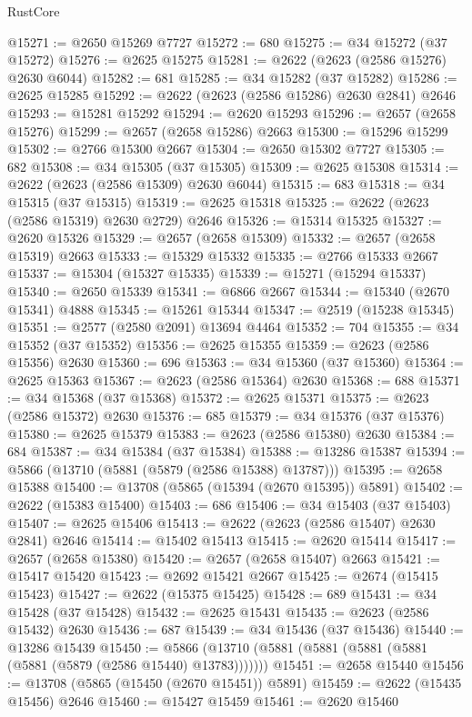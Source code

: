 \begin{lexlean}{RustCore}
\begin{coremodule}
@15271 := @2650 @15269 @7727
@15272 := 680
@15275 := @34 @15272 (@37 @15272)
@15276 := @2625 @15275
@15281 := @2622 (@2623 (@2586 @15276) @2630 @6044)
@15282 := 681
@15285 := @34 @15282 (@37 @15282)
@15286 := @2625 @15285
@15292 := @2622 (@2623 (@2586 @15286) @2630 @2841) @2646
@15293 := @15281 @15292
@15294 := @2620 @15293
@15296 := @2657 (@2658 @15276)
@15299 := @2657 (@2658 @15286) @2663
@15300 := @15296 @15299
@15302 := @2766 @15300 @2667
@15304 := @2650 @15302 @7727
@15305 := 682
@15308 := @34 @15305 (@37 @15305)
@15309 := @2625 @15308
@15314 := @2622 (@2623 (@2586 @15309) @2630 @6044)
@15315 := 683
@15318 := @34 @15315 (@37 @15315)
@15319 := @2625 @15318
@15325 := @2622 (@2623 (@2586 @15319) @2630 @2729) @2646
@15326 := @15314 @15325
@15327 := @2620 @15326
@15329 := @2657 (@2658 @15309)
@15332 := @2657 (@2658 @15319) @2663
@15333 := @15329 @15332
@15335 := @2766 @15333 @2667
@15337 := @15304 (@15327 @15335)
@15339 := @15271 (@15294 @15337)
@15340 := @2650 @15339
@15341 := @6866 @2667
@15344 := @15340 (@2670 @15341) @4888
@15345 := @15261 @15344
@15347 := @2519 (@15238 @15345)
@15351 := @2577 (@2580 @2091) @13694 @4464
@15352 := 704
@15355 := @34 @15352 (@37 @15352)
@15356 := @2625 @15355
@15359 := @2623 (@2586 @15356) @2630
@15360 := 696
@15363 := @34 @15360 (@37 @15360)
@15364 := @2625 @15363
@15367 := @2623 (@2586 @15364) @2630
@15368 := 688
@15371 := @34 @15368 (@37 @15368)
@15372 := @2625 @15371
@15375 := @2623 (@2586 @15372) @2630
@15376 := 685
@15379 := @34 @15376 (@37 @15376)
@15380 := @2625 @15379
@15383 := @2623 (@2586 @15380) @2630
@15384 := 684
@15387 := @34 @15384 (@37 @15384)
@15388 := @13286 @15387
@15394 := @5866 (@13710 (@5881 (@5879 (@2586 @15388) @13787)))
@15395 := @2658 @15388
@15400 := @13708 (@5865 (@15394 (@2670 @15395)) @5891)
@15402 := @2622 (@15383 @15400)
@15403 := 686
@15406 := @34 @15403 (@37 @15403)
@15407 := @2625 @15406
@15413 := @2622 (@2623 (@2586 @15407) @2630 @2841) @2646
@15414 := @15402 @15413
@15415 := @2620 @15414
@15417 := @2657 (@2658 @15380)
@15420 := @2657 (@2658 @15407) @2663
@15421 := @15417 @15420
@15423 := @2692 @15421 @2667
@15425 := @2674 (@15415 @15423)
@15427 := @2622 (@15375 @15425)
@15428 := 689
@15431 := @34 @15428 (@37 @15428)
@15432 := @2625 @15431
@15435 := @2623 (@2586 @15432) @2630
@15436 := 687
@15439 := @34 @15436 (@37 @15436)
@15440 := @13286 @15439
@15450 := @5866 (@13710 (@5881 (@5881 (@5881 (@5881 (@5881 (@5879 (@2586 @15440) @13783)))))))
@15451 := @2658 @15440
@15456 := @13708 (@5865 (@15450 (@2670 @15451)) @5891)
@15459 := @2622 (@15435 @15456) @2646
@15460 := @15427 @15459
@15461 := @2620 @15460

\end{coremodule}
\end{lexlean}
